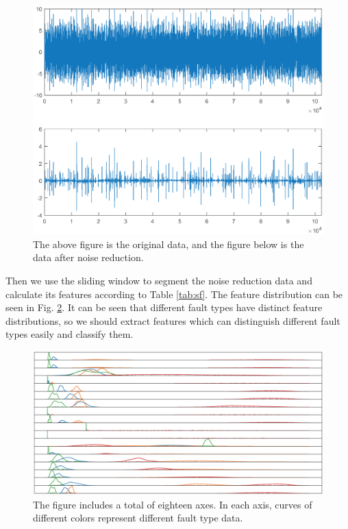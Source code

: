 \documentclass{modified}
\begin{document}
\begin{figure}[htbp]
	\centering
	\includegraphics[width=\columnwidth]{pre.eps}
	\caption{The above figure is the original data, and the figure below is the data after noise reduction.}
	\label{fig:pre}
\end{figure}

Then we use the sliding window to segment the noise reduction data and calculate its features according to Table \ref{tab:sf}. The feature distribution can be seen in Fig. \ref{fig:feature}. It can be seen that different fault types have distinct feature distributions, so we should extract features which can distinguish different fault types easily and classify them.

\begin{figure}[htbp]
	\centering
	\includegraphics[width=\columnwidth]{feature.eps}
	\caption{The figure includes a total of eighteen axes. In each axis, curves of different colors represent different fault type data.}
	\label{fig:feature}
\end{figure}
\end{document}
